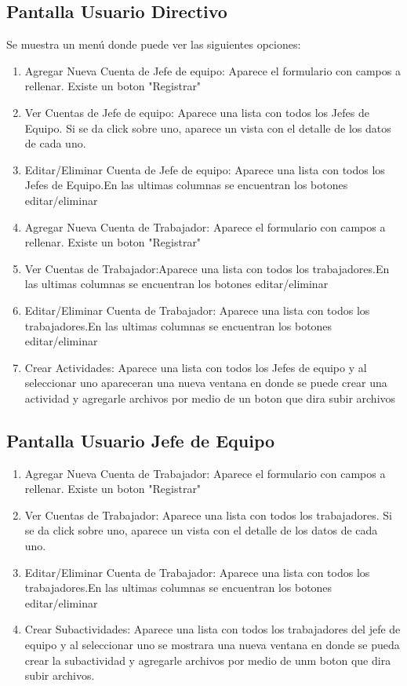 \documentclass[11pt,a4paper]{article}
\begin{document}
\subsection{Pantalla Usuario Directivo}
Se muestra un menú donde puede ver las siguientes opciones:
\begin{enumerate}
\item Agregar Nueva Cuenta de Jefe de equipo: Aparece el formulario con campos a rellenar. Existe un boton "Registrar"
\item Ver Cuentas de Jefe de equipo: Aparece una lista con todos los Jefes de Equipo. Si se da click sobre uno, aparece un vista con el detalle de los datos de cada uno.
\item Editar/Eliminar Cuenta de Jefe de equipo: Aparece una lista con todos los Jefes de Equipo.En las ultimas columnas se encuentran los botones editar/eliminar

\item Agregar Nueva Cuenta de Trabajador: Aparece el formulario con campos a rellenar. Existe un boton "Registrar"
\item Ver Cuentas de Trabajador:Aparece una lista con todos los trabajadores.En las ultimas columnas se encuentran los botones editar/eliminar
\item Editar/Eliminar Cuenta de Trabajador: Aparece una lista con todos los trabajadores.En las ultimas columnas se encuentran los botones editar/eliminar
\item Crear Actividades: Aparece una lista con todos los Jefes de equipo y al seleccionar uno apareceran una nueva ventana en donde se puede crear una actividad y agregarle archivos por medio de un boton que dira subir archivos
\end{enumerate}
\subsection{Pantalla Usuario Jefe de Equipo}
\begin{enumerate}
\item Agregar Nueva Cuenta de Trabajador: Aparece el formulario con campos a rellenar. Existe un boton "Registrar"
\item Ver Cuentas de Trabajador: Aparece una lista con todos los trabajadores. Si se da click sobre uno, aparece un vista con el detalle de los datos de cada uno.
\item Editar/Eliminar Cuenta de Trabajador: Aparece una lista con todos los trabajadores.En las ultimas columnas se encuentran los botones editar/eliminar
\item Crear Subactividades: Aparece una lista con todos los trabajadores del jefe de equipo y al seleccionar uno se mostrara una nueva ventana en donde se pueda crear la subactividad y agregarle archivos por medio de unm boton que dira subir archivos.
\end{enumerate}
\end{document}
